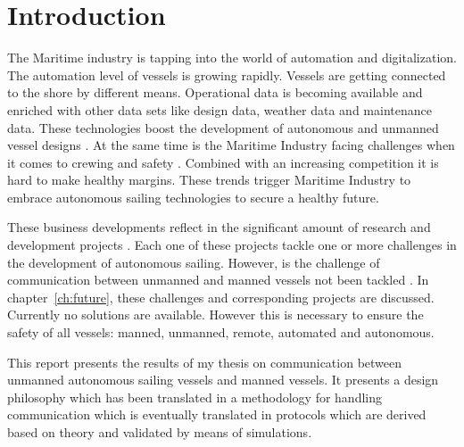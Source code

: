 \chapter*{Introduction}
\label{sec:introduction}

The Maritime industry is tapping into the world of automation and digitalization. The automation level of vessels is growing rapidly. Vessels are getting connected to the shore by different means. Operational data is becoming available and enriched with other data sets like design data, weather data and maintenance data. These technologies boost the development of autonomous and unmanned vessel designs \cite{Blanke2017}. 
At the same time is the Maritime Industry facing challenges when it comes to crewing and safety \cite{Cappelle2018}. Combined with an increasing competition it is hard to make healthy margins. These trends trigger Maritime Industry to embrace autonomous sailing technologies to secure a healthy future.

These business developments reflect in the significant amount of research and development projects \cite{SMASH2017} \cite{Eriksen2017} \cite{MUNIN2016} \cite{Sames2017} \cite{RollsRoyce2015} \cite{Waterborne2016}. Each one of these projects tackle one or more challenges in the development of autonomous sailing. However, is the challenge of communication between unmanned and manned vessels not been tackled \cite{Saarni2018}. In chapter~\ref{ch:future}, these challenges and corresponding projects are discussed. Currently no solutions are available. However this is necessary to ensure the safety of all vessels: manned, unmanned, remote, automated and autonomous.

This report presents the results of my thesis on communication between unmanned autonomous sailing vessels and manned vessels. It presents a design philosophy which has been translated in a methodology for handling communication which is eventually translated in protocols which are derived based on theory and validated by means of simulations.

